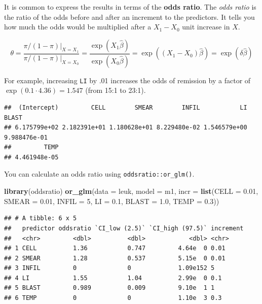 \documentclass[
]{book}
\newenvironment{Shaded}{\begin{snugshade}}{\end{snugshade}}
\newcommand{\DataTypeTok}[1]{\textcolor[rgb]{0.13,0.29,0.53}{#1}}
\newcommand{\DecValTok}[1]{\textcolor[rgb]{0.00,0.00,0.81}{#1}}
\newcommand{\FloatTok}[1]{\textcolor[rgb]{0.00,0.00,0.81}{#1}}
\newcommand{\KeywordTok}[1]{\textcolor[rgb]{0.13,0.29,0.53}{\textbf{#1}}}
\newcommand{\NormalTok}[1]{#1}
\newcommand{\OperatorTok}[1]{\textcolor[rgb]{0.81,0.36,0.00}{\textbf{#1}}}
\newcommand{\StringTok}[1]{\textcolor[rgb]{0.31,0.60,0.02}{#1}}
\begin{document}
It is common to express the results in terms of the \textbf{odds ratio}. The \emph{odds ratio} is the ratio of the odds before and after an increment to the predictors. It tells you how much the odds would be multiplied after a \(X_1 - X_0\) unit increase in \(X\).

\[\theta = \frac{\pi / (1 - \pi) |_{X = X_1}}{\pi / (1 - \pi) |_{X = X_0}} = \frac{\exp (X_1 \hat{\beta})}{\exp (X_0 \hat{\beta})} = \exp ((X_1-X_0) \hat{\beta}) = \exp (\delta \hat{\beta})\]

For example, increasing \texttt{LI} by .01 increases the odds of remission by a factor of \(\exp(0.1 \cdot 4.36) = 1.547\) (from 15:1 to 23:1).

\begin{Shaded}
\end{Shaded}

\begin{verbatim}
##  (Intercept)         CELL        SMEAR        INFIL           LI        BLAST 
## 6.175799e+02 2.182391e+01 1.180628e+01 8.229480e-02 1.546579e+00 9.988476e-01 
##         TEMP 
## 4.461948e-05
\end{verbatim}

You can calculate an odds ratio using \texttt{oddsratio::or\_glm()}.

\begin{Shaded}
\begin{Highlighting}[]
\KeywordTok{library}\NormalTok{(oddsratio)}
\KeywordTok{or_glm}\NormalTok{(}\DataTypeTok{data =}\NormalTok{ leuk, }
       \DataTypeTok{model =}\NormalTok{ m1, }
       \DataTypeTok{incr =} \KeywordTok{list}\NormalTok{(}\DataTypeTok{CELL =} \FloatTok{0.01}\NormalTok{, }
                   \DataTypeTok{SMEAR =} \FloatTok{0.01}\NormalTok{, }
                   \DataTypeTok{INFIL =} \DecValTok{5}\NormalTok{, }
                   \DataTypeTok{LI =} \FloatTok{0.1}\NormalTok{, }
                   \DataTypeTok{BLAST =} \FloatTok{1.0}\NormalTok{, }
                   \DataTypeTok{TEMP =} \FloatTok{0.3}\NormalTok{))}
\end{Highlighting}
\end{Shaded}

\begin{verbatim}
## # A tibble: 6 x 5
##   predictor oddsratio `CI_low (2.5)` `CI_high (97.5)` increment
##   <chr>         <dbl>          <dbl>            <dbl> <chr>    
## 1 CELL          1.36           0.747         4.64e  0 0.01     
## 2 SMEAR         1.28           0.537         5.15e  0 0.01     
## 3 INFIL         0              0             1.09e152 5        
## 4 LI            1.55           1.04          2.99e  0 0.1      
## 5 BLAST         0.989          0.009         9.10e  1 1        
## 6 TEMP          0              0             1.10e  3 0.3
\end{verbatim}
\end{document}
